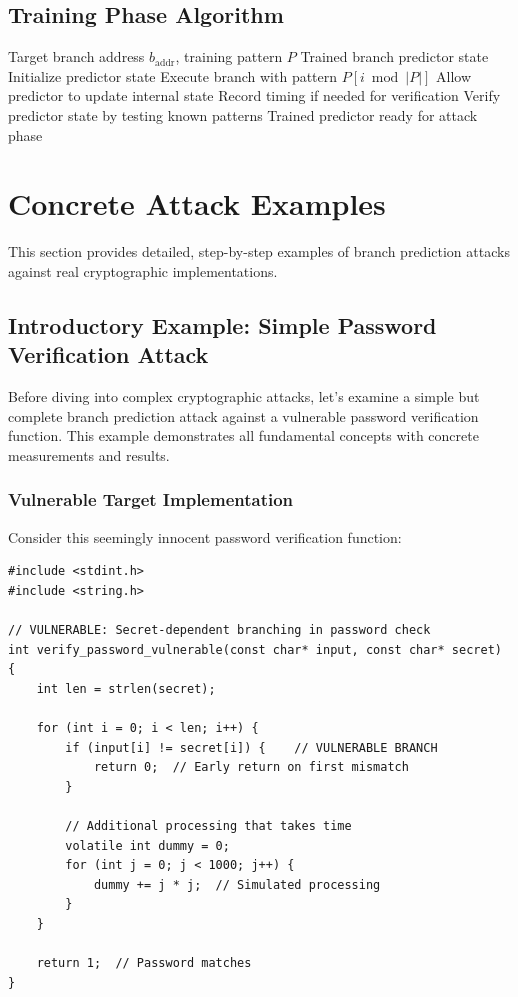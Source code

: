 \documentclass[11pt,a4paper]{article}
\theoremstyle{definition}
\begin{document}
\subsection{Training Phase Algorithm}

\begin{algorithm}
\caption{Branch Predictor Training}
\begin{algorithmic}[1]
\REQUIRE Target branch address $b_{\text{addr}}$, training pattern $P$
\ENSURE Trained branch predictor state
\STATE Initialize predictor state
    \STATE Execute branch with pattern $P[i \bmod |P|]$
    \STATE Allow predictor to update internal state
    \STATE Record timing if needed for verification
\ENDFOR
\STATE Verify predictor state by testing known patterns
\RETURN Trained predictor ready for attack phase
\end{algorithmic}
\end{algorithm}

\section{Concrete Attack Examples}

This section provides detailed, step-by-step examples of branch prediction attacks against real cryptographic implementations.

\subsection{Introductory Example: Simple Password Verification Attack}

Before diving into complex cryptographic attacks, let's examine a simple but complete branch prediction attack against a vulnerable password verification function. This example demonstrates all fundamental concepts with concrete measurements and results.

\subsubsection{Vulnerable Target Implementation}

Consider this seemingly innocent password verification function:

\begin{lstlisting}[caption={Simple Vulnerable Password Verification}]
#include <stdint.h>
#include <string.h>

// VULNERABLE: Secret-dependent branching in password check
int verify_password_vulnerable(const char* input, const char* secret) {
    int len = strlen(secret);
    
    for (int i = 0; i < len; i++) {
        if (input[i] != secret[i]) {    // VULNERABLE BRANCH
            return 0;  // Early return on first mismatch
        }
        
        // Additional processing that takes time
        volatile int dummy = 0;
        for (int j = 0; j < 1000; j++) {
            dummy += j * j;  // Simulated processing
        }
    }
    
    return 1;  // Password matches
}
\end{lstlisting}
\end{document}
